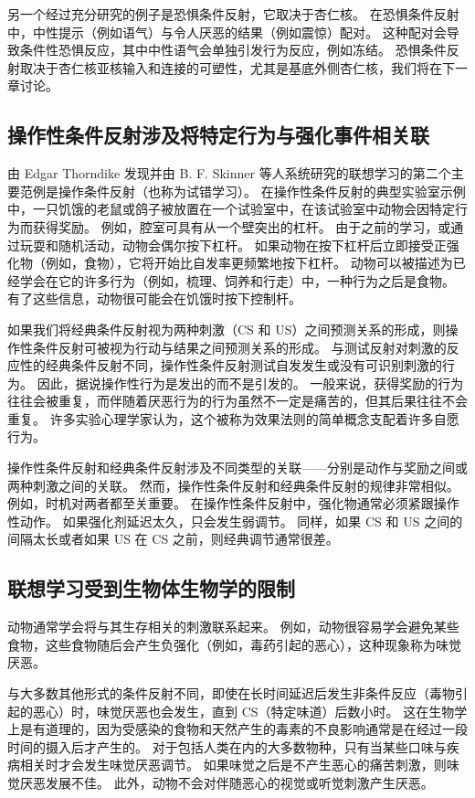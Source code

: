 另一个经过充分研究的例子是恐惧条件反射，它取决于杏仁核。 在恐惧条件反射中，中性提示（例如语气）与令人厌恶的结果（例如震惊）配对。 这种配对会导致条件性恐惧反应，其中中性语气会单独引发行为反应，例如冻结。 恐惧条件反射取决于杏仁核亚核输入和连接的可塑性，尤其是基底外侧杏仁核，我们将在下一章讨论。

\subsection{操作性条件反射涉及将特定行为与强化事件相关联}
由 Edgar Thorndike 发现并由 B. F. Skinner 等人系统研究的联想学习的第二个主要范例是操作条件反射（也称为试错学习）。 在操作性条件反射的典型实验室示例中，一只饥饿的老鼠或鸽子被放置在一个试验室中，在该试验室中动物会因特定行为而获得奖励。 例如，腔室可具有从一个壁突出的杠杆。 由于之前的学习，或通过玩耍和随机活动，动物会偶尔按下杠杆。 如果动物在按下杠杆后立即接受正强化物（例如，食物），它将开始比自发率更频繁地按下杠杆。 动物可以被描述为已经学会在它的许多行为（例如，梳理、饲养和行走）中，一种行为之后是食物。 有了这些信息，动物很可能会在饥饿时按下控制杆。

如果我们将经典条件反射视为两种刺激（CS 和 US）之间预测关系的形成，则操作性条件反射可被视为行动与结果之间预测关系的形成。 与测试反射对刺激的反应性的经典条件反射不同，操作性条件反射测试自发发生或没有可识别刺激的行为。 因此，据说操作性行为是发出的而不是引发的。 一般来说，获得奖励的行为往往会被重复，而伴随着厌恶行为的行为虽然不一定是痛苦的，但其后果往往不会重复。 许多实验心理学家认为，这个被称为效果法则的简单概念支配着许多自愿行为。

操作性条件反射和经典条件反射涉及不同类型的关联——分别是动作与奖励之间或两种刺激之间的关联。 然而，操作性条件反射和经典条件反射的规律非常相似。 例如，时机对两者都至关重要。 在操作性条件反射中，强化物通常必须紧跟操作性动作。 如果强化剂延迟太久，只会发生弱调节。 同样，如果 CS 和 US 之间的间隔太长或者如果 US 在 CS 之前，则经典调节通常很差。

\subsection{联想学习受到生物体生物学的限制}
动物通常学会将与其生存相关的刺激联系起来。 例如，动物很容易学会避免某些食物，这些食物随后会产生负强化（例如，毒药引起的恶心），这种现象称为味觉厌恶。

与大多数其他形式的条件反射不同，即使在长时间延迟后发生非条件反应（毒物引起的恶心）时，味觉厌恶也会发生，直到 CS（特定味道）后数小时。 这在生物学上是有道理的，因为受感染的食物和天然产生的毒素的不良影响通常是在经过一段时间的摄入后才产生的。 对于包括人类在内的大多数物种，只有当某些口味与疾病相关时才会发生味觉厌恶调节。 如果味觉之后是不产生恶心的痛苦刺激，则味觉厌恶发展不佳。 此外，动物不会对伴随恶心的视觉或听觉刺激产生厌恶。


